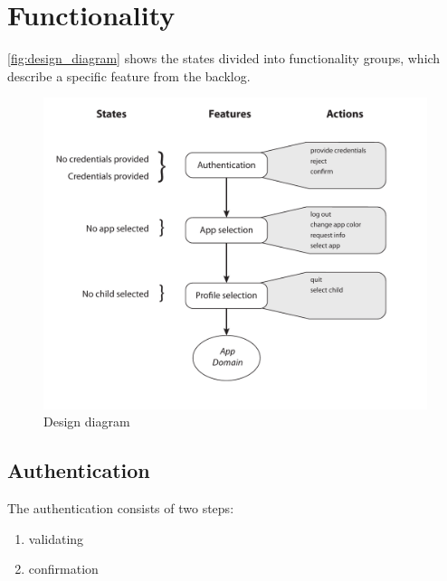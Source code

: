 \section{Functionality}

\autoref{fig:design_diagram} shows the states divided into functionality groups, which describe a specific feature from the backlog.


\begin{figure}[h]
	\centering
	\includegraphics[width=1\textwidth]{gfx/design_diagram.pdf}
	\caption{Design diagram}
	\label{fig:design_diagram}
\end{figure}

\subsection{Authentication}


\noindent The authentication consists of two steps:

\begin{enumerate}
	\item validating
	\item confirmation
\end{enumerate}

